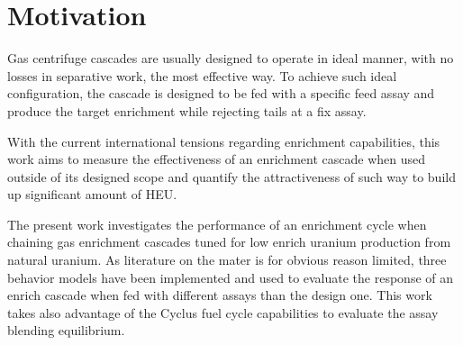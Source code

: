 \section{Motivation}

Gas centrifuge cascades are usually designed to operate in ideal manner, with no
losses in separative work, the most effective way. To achieve such ideal
configuration, the cascade is designed to be fed with a specific feed assay and
produce the target  enrichment while rejecting tails at a fix assay.

With the current international tensions regarding enrichment capabilities, this
work aims to measure the effectiveness of an enrichment cascade when used outside of
its designed scope and quantify the attractiveness of such way to build up
significant amount of \gls{HEU}.

The present work investigates the performance of an enrichment cycle when chaining
gas enrichment cascades tuned for low enrich uranium production from natural
uranium. As literature on the mater is for obvious reason limited, three
behavior models have been implemented and used to evaluate the response of an
enrich cascade when fed with different assays than the design one. This work
takes also advantage of the Cyclus\cite{cyclus} fuel cycle capabilities to
evaluate the assay blending equilibrium.

